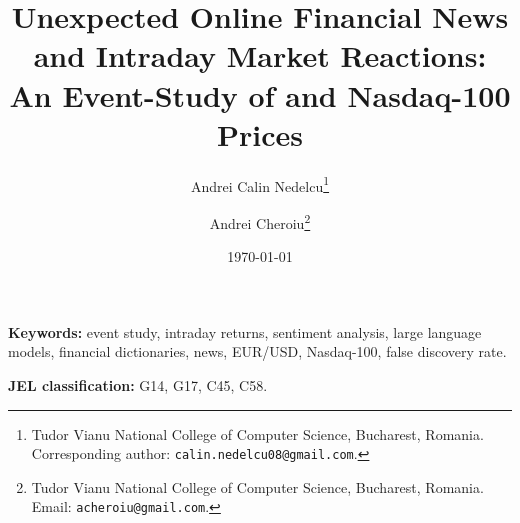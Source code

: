 \documentclass[12pt, a4paper]{article}
\title{Unexpected Online Financial News and Intraday Market Reactions: \\
       An Event-Study of \eurusd{} and Nasdaq-100 Prices}
\author{
  Andrei Calin Nedelcu\thanks{Tudor Vianu National College of Computer Science, Bucharest, Romania. Corresponding author: \texttt{calin.nedelcu08@gmail.com}.}
  \and
  Andrei Cheroiu\thanks{Tudor Vianu National College of Computer Science, Bucharest, Romania. Email: \texttt{acheroiu@gmail.com}.}
}
\date{\today}
\begin{document}
\maketitle



\medskip
\noindent\textbf{Keywords:} event study, intraday returns, sentiment analysis,
large language models, financial dictionaries, news, EUR/USD, Nasdaq-100,
false discovery rate.

\medskip
\noindent\textbf{JEL classification:} G14, G17, C45, C58.

\clearpage











\clearpage



\clearpage



\appendix

\end{document}

